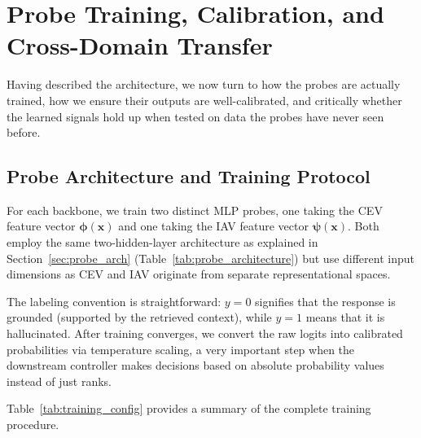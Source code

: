 \chapter{Probe Training, Calibration, and Cross-Domain Transfer}
\label{ch:probe_training}

Having described the architecture, we now turn to how the probes are actually trained, how we ensure their outputs are well-calibrated, and critically whether the learned signals hold up when tested on data the probes have never seen before.

\section{Probe Architecture and Training Protocol}
\label{sec:training_protocol}

For each backbone, we train two distinct MLP probes, one taking the CEV feature vector $\boldsymbol{\phi}(\mathbf{x})$ and one taking the IAV feature vector $\boldsymbol{\psi}(\mathbf{x})$. Both employ the same two-hidden-layer architecture as explained in Section~\ref{sec:probe_arch} (Table~\ref{tab:probe_architecture}) but use different input dimensions as CEV and IAV originate from separate representational spaces.

The labeling convention is straightforward: $y = 0$ signifies that the response is grounded (supported by the retrieved context), while $y = 1$ means that it is hallucinated. After training converges, we convert the raw logits into calibrated probabilities via temperature scaling, a very important step when the downstream controller makes decisions based on absolute probability values instead of just ranks.

Table~\ref{tab:training_config} provides a summary of the complete training procedure.

